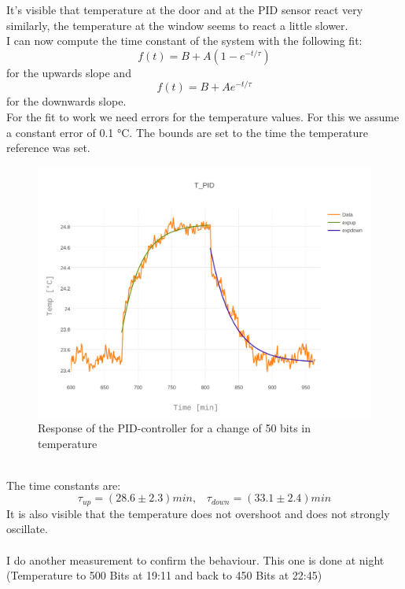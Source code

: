 \documentclass[12pt]{scrartcl}
\begin{document}
      It's visible that temperature at the door and at the PID sensor react
      very similarly, the temperature at the window seems to react a little
      slower.\\
      I can now compute the time constant of the system with the following fit:
      \begin{equation*}
        f(t) = B + A(1-e^{-t/\tau})
      \end{equation*}
      for the upwards slope and
      \begin{equation*}
        f(t) = B + A e^{-t/\tau}
      \end{equation*}
      for the downwards slope. \\
      For the fit to work we need errors for the temperature values. For this
      we assume a constant error of 0.1 °C. The bounds are set to the time the
      temperature reference was set.
      \begin{figure}[h!]
        \centering
        \includegraphics[width = \textwidth]{./plots/plot_image(12)}
        \caption{Response of the PID-controller for a change of 50 bits in
        temperature}
        \label{fig13}
      \end{figure}\\
      The time constants are:
      $$\tau_{up} = (28.6 \pm 2.3) min, \;\;\; \tau_{down} = (33.1 \pm 2.4) min$$
      It is also visible that the temperature does not overshoot and does not
      strongly oscillate. \\\\
      I do another measurement to confirm the behaviour. This one is done at
      night (Temperature to 500 Bits at 19:11 and back to 450 Bits at 22:45)
\end{document}
